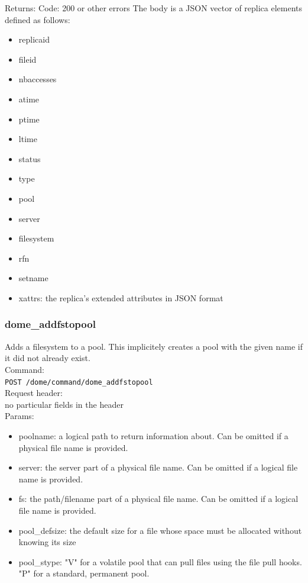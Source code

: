 \documentclass[a4paper,10pt]{scrreprt}
\begin{document}
Returns:
Code: 200 or other errors
The body is a JSON vector of replica elements defined as follows:
\begin{itemize}

 \item replicaid
 \item fileid
 \item nbaccesses
 \item atime
 \item ptime
 \item ltime
 \item status
 \item type
 \item pool
 \item server
 \item filesystem
 \item rfn
 \item setname
 \item xattrs: the replica's extended attributes in JSON format
\end{itemize}


\subsubsection{dome\_addfstopool}
Adds a filesystem to a pool. This implicitely creates a pool with the given name if it did not already exist.\\

Command:\\
\lstinline"POST /dome/command/dome_addfstopool"\\

Request header:\\
no particular fields in the header\\

Params:
\begin{itemize}
 \item poolname: a logical path to return information about. Can be omitted if a physical file name is provided.
 \item server: the server part of a physical file name. Can be omitted if a logical file name is provided.
 \item fs: the path/filename part of a physical file name. Can be omitted if a logical file name is provided.
 \item pool\_defsize: the default size for a file whose space must be allocated without knowing its size
 \item pool\_stype: "V" for a volatile pool that can pull files using the file pull hooks. "P" for a standard, permanent pool.
\end{itemize}
\end{document}
